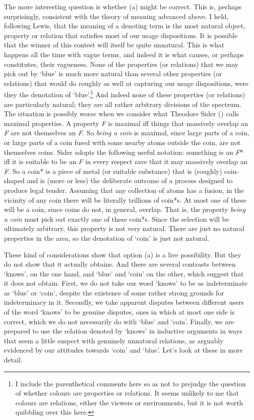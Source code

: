 \documentclass[
  10pt,
  letterpaper,
  DIV=11,
  numbers=noendperiod,
  twoside]{scrartcl}
\begin{document}
The more interesting question is whether (a) might be correct. This is,
perhaps surprisingly, consistent with the theory of meaning advanced
above. I held, following Lewis, that the meaning of a denoting term is
the most natural object, property or relation that satisfies most of our
usage dispositions. It is possible that the winner of this contest will
itself be quite unnatural. This is what happens all the time with vague
terms, and indeed it is what causes, or perhaps constitutes, their
vagueness. None of the properties (or relations) that we may pick out by
`blue' is much more natural than several other properties (or relations)
that would do roughly as well at capturing our usage dispositions, were
they the denotation of `blue'.\footnote{I include the parenthetical
  comments here so as not to prejudge the question of whether colours
  are properties or relations. It seems unlikely to me that colours are
  relations, either the viewers or environments, but it is not worth
  quibbling over this here.} And indeed none of these properties (or
relations) are particularly natural; they are all rather arbitrary
divisions of the spectrum. The situation is possibly worse when we
consider what Theodore Sider ()
calls maximal properties. A property \emph{F} is maximal iff things that
massively overlap an \emph{F} are not themselves an \emph{F}. So
\emph{being a coin} is maximal, since large parts of a coin, or large
parts of a coin fused with some nearby atoms outside the coin, are not
themselves coins. Sider adopts the following useful notation: something
is an \emph{F}* iff it is suitable to be an \emph{F} in every respect
save that it may massively overlap an \emph{F}. So a coin* is a piece of
metal (or suitable substance) that is (roughly) coin-shaped and is (more
or less) the deliberate outcome of a process designed to produce legal
tender. Assuming that any collection of atoms has a fusion, in the
vicinity of any coin there will be literally trillions of coin*s. At
most one of these will be a coin, since coins do not, in general,
overlap. That is, the property \emph{being a coin} must pick out exactly
one of these coin*s. Since the selection will be ultimately arbitrary,
this property is not very natural. There are just no natural properties
in the area, so the denotation of `coin' is just not natural.

These kind of considerations show that option (a) is a live possibility.
But they do not show that it actually obtains. And there are several
contrasts between `knows', on the one hand, and `blue' and `coin' on the
other, which suggest that it does not obtain. First, we do not take our
word `knows' to be as indeterminate as `blue' or `coin', despite the
existence of some rather strong grounds for indeterminacy in it.
Secondly, we take apparent disputes between different users of the word
`knows' to be genuine disputes, ones in which at most one side is
correct, which we do not necessarily do with `blue' and `coin'. Finally,
we are prepared to use the relation denoted by `knows' in inductive
arguments in ways that seem a little suspect with genuinely unnatural
relations, as arguably evidenced by our attitudes towards `coin' and
`blue'. Let's look at these in more detail.
\end{document}
